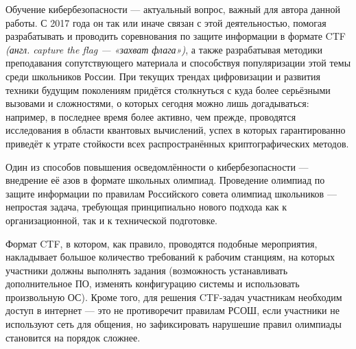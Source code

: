 \Introduction


Обучение кибербезопасности --- актуальный вопрос, важный для автора данной работы. С 2017 года он так или иначе связан с этой деятельностью, помогая разрабатывать и проводить соревнования по защите информации в формате CTF \textit{(англ. capture the flag --- «захват флага»)}, а также разрабатывая методики преподавания сопутствующего материала\cite{NTISchool} и способствуя популяризации этой темы среди школьников России. При текущих трендах цифровизации и развития техники будущим поколениям придётся столкнуться с куда более серьёзными вызовами и сложностями, о которых сегодня можно лишь догадываться: например, в последнее время более активно, чем прежде, проводятся исследования в области квантовых вычислений\cite{Quantum1}\cite{Quantum2}, успех в которых гарантированно приведёт к утрате стойкости всех распространённых криптографических методов\cite{Quantum3}.

Один из способов повышения осведомлённости о кибербезопасности --- внедрение её азов в формате школьных олимпиад. Проведение олимпиад по защите информации по правилам Российского совета олимпиад школьников --- непростая задача, требующая принципиально нового подхода как к организационной, так и к технической подготовке.

Формат CTF, в котором, как правило, проводятся подобные мероприятия, накладывает большое количество требований к рабочим станциям, на которых участники должны выполнять задания (возможность устанавливать дополнительное ПО, изменять конфигурацию системы и использовать произвольную ОС). Кроме того, для решения CTF-задач участникам необходим доступ в интернет --- это не противоречит правилам РСОШ, если участники не используют сеть для общения, но зафиксировать нарушешие правил олимпиады становится на порядок сложнее.

